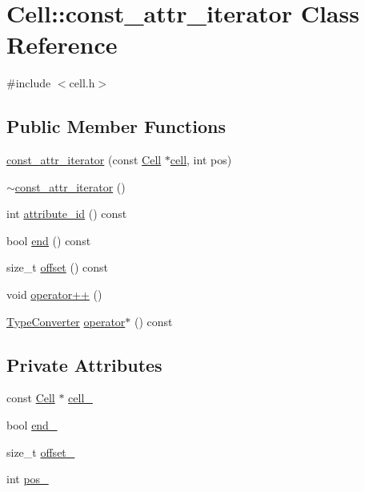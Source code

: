 \hypertarget{classCell_1_1const__attr__iterator}{}\section{Cell\+:\+:const\+\_\+attr\+\_\+iterator Class Reference}
\label{classCell_1_1const__attr__iterator}


{\ttfamily \#include $<$cell.\+h$>$}

\subsection*{Public Member Functions}
\begin{DoxyCompactItemize}
\item 
\hyperlink{classCell_1_1const__attr__iterator_a0a9f21ad1a27e7d5449bee58f7473e5e}{const\+\_\+attr\+\_\+iterator} (const \hyperlink{classCell}{Cell} $\ast$\hyperlink{classCell_a1387c431e72e5249686ca153bbe00150}{cell}, int pos)
\item 
\hyperlink{classCell_1_1const__attr__iterator_a1ad6eab98eb5873f7ea4b870370fe94d}{$\sim$const\+\_\+attr\+\_\+iterator} ()
\item 
int \hyperlink{classCell_1_1const__attr__iterator_af0c21ff1840386fad37852585eb97eb1}{attribute\+\_\+id} () const 
\item 
bool \hyperlink{classCell_1_1const__attr__iterator_aea51999b8bf78ae7975af183a1103013}{end} () const 
\item 
size\+\_\+t \hyperlink{classCell_1_1const__attr__iterator_a5f30cdc46d40fdd08a465c1dd9538cd7}{offset} () const 
\item 
void \hyperlink{classCell_1_1const__attr__iterator_ae5c5740d9ac66b9fd4ad9e9a83d19306}{operator++} ()
\item 
\hyperlink{classCell_1_1TypeConverter}{Type\+Converter} \hyperlink{classCell_1_1const__attr__iterator_ac488fe432c56cda5a150c8f5f208ed73}{operator$\ast$} () const 
\end{DoxyCompactItemize}
\subsection*{Private Attributes}
\begin{DoxyCompactItemize}
\item 
const \hyperlink{classCell}{Cell} $\ast$ \hyperlink{classCell_1_1const__attr__iterator_a0d83e706b8acf0da09b4ed652088bf02}{cell\+\_\+}
\item 
bool \hyperlink{classCell_1_1const__attr__iterator_a77098fc229edb47e74f036e392ff59c1}{end\+\_\+}
\item 
size\+\_\+t \hyperlink{classCell_1_1const__attr__iterator_ac6d82b8089c04a24ef74cd1a6317d8f6}{offset\+\_\+}
\item 
int \hyperlink{classCell_1_1const__attr__iterator_a304d6a91bd8d2f457c83c53165d373d6}{pos\+\_\+}
\end{DoxyCompactItemize}


